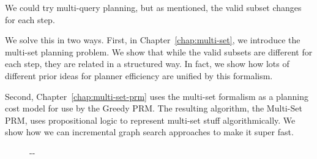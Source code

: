 \documentclass{report}
\newlength{\offsetpage}
\newenvironment{widepage}
   {\begin{adjustwidth}{-\offsetpage}{-\offsetpage}%
    \addtolength{\textwidth}{2\offsetpage}}%
{\end{adjustwidth}}
\begin{document}
We could try multi-query planning,
but as mentioned,
the valid subset changes for each step.

We solve this in two ways.
First, in Chapter~\ref{chap:multi-set},
we introduce the multi-set planning problem.
We show that while the valid subsets are different for each step,
they are related in a structured way.
In fact, we show how lots of different prior ideas for planner
efficiency are unified by this formalism.

Second, Chapter~\ref{chap:multi-set-prm}
uses the multi-set formalism as a planning cost model
for use by the Greedy PRM.
The resulting algorithm,
the Multi-Set PRM,
uses propositional logic to represent multi-set stuff
algorithmically.
We show how we can incremental graph search approaches
to make it super fast.

{
\setlength{\offsetpage}{0.75in}
\begin{figure}
\begin{widepage}
\begin{center}


\end{center}
\end{widepage}
\end{figure}}
\end{document}
